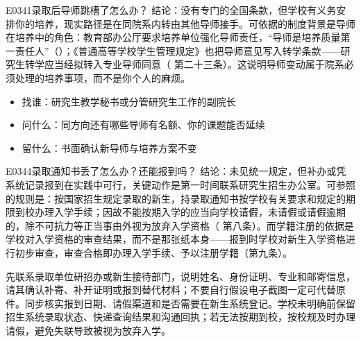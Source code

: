 \begin{qa}{E0341}{录取后导师跳槽了怎么办？}
结论：没有专门的全国条款，但学校有义务安排你的培养，现实路径是在同院系内转由其他导师接手。可依据的制度背景是导师在培养中的角色：教育部办公厅要求培养单位强化导师责任，“导师是培养质量第一责任人”（）；《普通高等学校学生管理规定》也把导师意见写入转学条款——研究生转学应当经拟转入专业导师同意（ 第二十三条）。这说明导师变动属于院系必须处理的培养事项，而不是你个人的麻烦。

\begin{itemize}
  \item 找谁：研究生教学秘书或分管研究生工作的副院长
  \item 问什么：同方向还有哪些导师有名额、你的课题能否延续
  \item 留什么：书面确认新导师与培养方案不变
\end{itemize}
\end{qa}

\begin{qa}{E0344}{录取通知书丢了怎么办？还能报到吗？}
结论：未见统一规定，但补办或凭系统记录报到在实践中可行，关键动作是第一时间联系研究生招生办公室。可参照的规则是：按国家招生规定录取的新生，持录取通知书按学校有关要求和规定的期限到校办理入学手续；因故不能按期入学的应当向学校请假，未请假或请假逾期的，除不可抗力等正当事由外视为放弃入学资格（ 第八条）。而学籍注册的依据是学校对入学资格的审查结果，而不是那张纸本身——报到时学校对新生入学资格进行初步审查，审查合格即办理入学手续、予以注册学籍（第九条）。

先联系录取单位研招办或新生接待部门，说明姓名、身份证明、专业和邮寄信息，请其确认补寄、补开证明或报到替代材料；不要自行假设电子截图一定可代替原件。同步核实报到日期、请假渠道和是否需要在新生系统登记。学校未明确前保留招生系统录取状态、快递查询结果和沟通回执；若无法按期到校，按校规及时办理请假，避免失联导致被视为放弃入学。
\end{qa}

